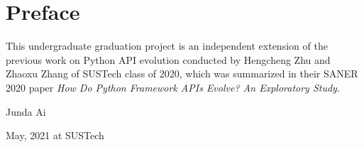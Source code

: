 \chapter{Preface}
\label{chap:preface}
\vskip 28pt

This undergraduate graduation project is an independent extension of the previous work on Python API evolution conducted by Hengcheng Zhu and Zhaoxu Zhang of SUSTech class of 2020, which was summarized in their SANER 2020 paper \textit{How Do Python Framework APIs Evolve? An Exploratory Study}.

\begin{flushright}

Junda Ai

May, 2021 at SUSTech

\end{flushright}
